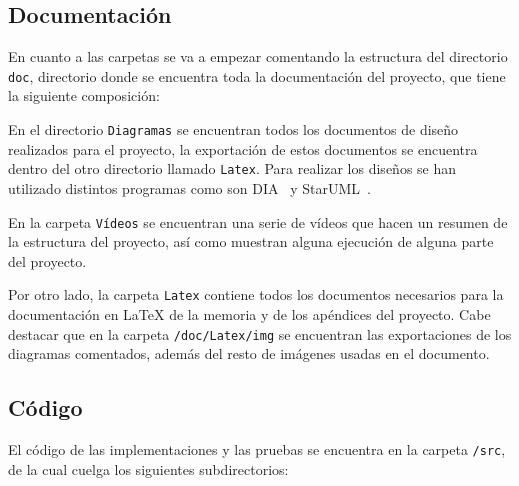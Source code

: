 \subsection{Documentación}
En cuanto a las carpetas se va a empezar comentando la estructura del directorio \texttt{doc}, directorio donde se encuentra toda la documentación del proyecto, que tiene la siguiente composición:

En el directorio \texttt{Diagramas} se encuentran todos los documentos de diseño realizados para el proyecto, la exportación de estos documentos se encuentra dentro del otro directorio llamado \texttt{Latex}. Para realizar los diseños se han utilizado distintos programas como son DIA~\cite{dia} y StarUML~\cite{staruml}.

En la carpeta \texttt{Vídeos} se encuentran una serie de vídeos que hacen un resumen de la estructura del proyecto, así como muestran alguna ejecución de alguna parte del proyecto.

Por otro lado, la carpeta \texttt{Latex} contiene todos los documentos necesarios para la documentación en \LaTeX{} de la memoria y de los apéndices del proyecto. Cabe destacar que en la carpeta \texttt{/doc/Latex/img} se encuentran las exportaciones de los diagramas comentados, además del resto de imágenes usadas en el documento.

\subsection{Código}
El código de las implementaciones y las pruebas se encuentra en la carpeta \texttt{/src}, de la cual cuelga los siguientes subdirectorios:

